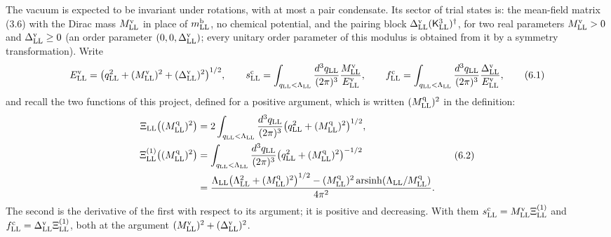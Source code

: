 \documentclass[
  10pt,
]{article}
\begin{document}
The vacuum is expected to be invariant under rotations, with at most a
pair condensate. Its sector of trial states is: the mean-field matrix
(3.6) with the Dirac mass \(M^{\rm v}_{\rm LL}\) in place of
\(m^{\rm b}_{\rm LL}\), no chemical potential, and the pairing block
\(\Delta^{\rm v}_{\rm LL}(\mathsf K^3_{\rm LL})^\dagger\), for two real
parameters \(M^{\rm v}_{\rm LL}>0\) and \(\Delta^{\rm v}_{\rm LL}\ge0\)
(an order parameter \((0,0,\Delta^{\rm v}_{\rm LL})\); every unitary
order parameter of this modulus is obtained from it by a symmetry
transformation). Write
\[E^{\rm v}_{\rm LL}=\big(q_{\rm LL}^2+(M^{\rm v}_{\rm LL})^2+(\Delta^{\rm v}_{\rm LL})^2\big)^{1/2},\qquad
s^{\rm c}_{\rm LL}=\int_{q_{\rm LL}<\Lambda_{\rm LL}}\frac{d^3q_{\rm LL}}{(2\pi)^3}\frac{M^{\rm v}_{\rm LL}}{E^{\rm v}_{\rm LL}},\qquad
f^{\rm c}_{\rm LL}=\int_{q_{\rm LL}<\Lambda_{\rm LL}}\frac{d^3q_{\rm LL}}{(2\pi)^3}\frac{\Delta^{\rm v}_{\rm LL}}{E^{\rm v}_{\rm LL}},\tag{6.1}\]
and recall the two functions of this project, defined for a positive
argument, which is written \((M^{\rm q}_{\rm LL})^2\) in the definition:
\[\begin{aligned}\Xi_{\rm LL}\big((M^{\rm q}_{\rm LL})^2\big)&=2\int_{q_{\rm LL}<\Lambda_{\rm LL}}\frac{d^3q_{\rm LL}}{(2\pi)^3}\big(q_{\rm LL}^2+(M^{\rm q}_{\rm LL})^2\big)^{1/2},\\
\Xi^{(1)}_{\rm LL}\big((M^{\rm q}_{\rm LL})^2\big)&=\int_{q_{\rm LL}<\Lambda_{\rm LL}}\frac{d^3q_{\rm LL}}{(2\pi)^3}\big(q_{\rm LL}^2+(M^{\rm q}_{\rm LL})^2\big)^{-1/2}\\
&=\frac{\Lambda_{\rm LL}\big(\Lambda_{\rm LL}^2+(M^{\rm q}_{\rm LL})^2\big)^{1/2}-(M^{\rm q}_{\rm LL})^2\,\mathrm{arsinh}(\Lambda_{\rm LL}/M^{\rm q}_{\rm LL})}{4\pi^2}.\end{aligned}\tag{6.2}\]
The second is the derivative of the first with respect to its argument;
it is positive and decreasing. With them
\(s^{\rm c}_{\rm LL}=M^{\rm v}_{\rm LL}\Xi^{(1)}_{\rm LL}\) and
\(f^{\rm c}_{\rm LL}=\Delta^{\rm v}_{\rm LL}\Xi^{(1)}_{\rm LL}\), both
at the argument \((M^{\rm v}_{\rm LL})^2+(\Delta^{\rm v}_{\rm LL})^2\).
\end{document}
